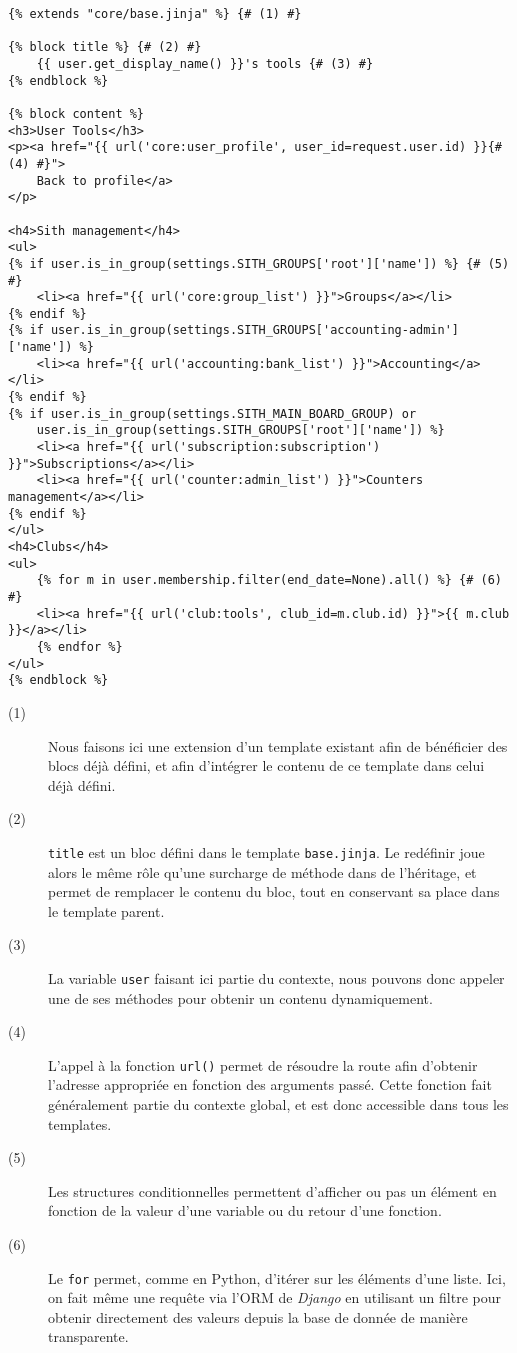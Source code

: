 \documentclass[a4paper]{report}
\begin{document}
\begin{addmargin}[-4em]{0em}
    \begin{verbatim}
{% extends "core/base.jinja" %} {# (1) #}

{% block title %} {# (2) #}
    {{ user.get_display_name() }}'s tools {# (3) #}
{% endblock %}

{% block content %}
<h3>User Tools</h3>
<p><a href="{{ url('core:user_profile', user_id=request.user.id) }}{# (4) #}">
    Back to profile</a>
</p>

<h4>Sith management</h4>
<ul>
{% if user.is_in_group(settings.SITH_GROUPS['root']['name']) %} {# (5) #}
    <li><a href="{{ url('core:group_list') }}">Groups</a></li>
{% endif %}
{% if user.is_in_group(settings.SITH_GROUPS['accounting-admin']['name']) %}
    <li><a href="{{ url('accounting:bank_list') }}">Accounting</a></li>
{% endif %}
{% if user.is_in_group(settings.SITH_MAIN_BOARD_GROUP) or
    user.is_in_group(settings.SITH_GROUPS['root']['name']) %}
    <li><a href="{{ url('subscription:subscription') }}">Subscriptions</a></li>
    <li><a href="{{ url('counter:admin_list') }}">Counters management</a></li>
{% endif %}
</ul>
<h4>Clubs</h4>
<ul>
    {% for m in user.membership.filter(end_date=None).all() %} {# (6) #}
    <li><a href="{{ url('club:tools', club_id=m.club.id) }}">{{ m.club }}</a></li>
    {% endfor %}
</ul>
{% endblock %}
    \end{verbatim}
\end{addmargin}

\begin{description}
    \item[(1)] Nous faisons ici une extension d'un template existant afin de bénéficier des blocs déjà défini, et afin
        d'intégrer le contenu de ce template dans celui déjà défini.
    \item[(2)] \verb#title# est un bloc défini dans le template \verb#base.jinja#. Le redéfinir joue alors le même rôle
        qu'une surcharge de méthode dans de l'héritage, et permet de remplacer le contenu du bloc, tout en conservant sa
        place dans le template parent.
    \item[(3)] La variable \verb#user# faisant ici partie du contexte, nous pouvons donc appeler une de ses méthodes
        pour obtenir un contenu dynamiquement.
    \item[(4)] L'appel à la fonction \verb#url()# permet de résoudre la route afin d'obtenir l'adresse appropriée en
        fonction des arguments passé. Cette fonction fait généralement partie du contexte global, et est donc accessible
        dans tous les templates.
    \item[(5)] Les structures conditionnelles permettent d'afficher ou pas un élément en fonction de la valeur d'une
        variable ou du retour d'une fonction.
    \item[(6)] Le \verb#for# permet, comme en Python, d'itérer sur les éléments d'une liste. Ici, on fait même une
        requête via l'ORM de \emph{Django} en utilisant un filtre pour obtenir directement des valeurs depuis la base de
        donnée de manière transparente.
\end{description}
\end{document}
